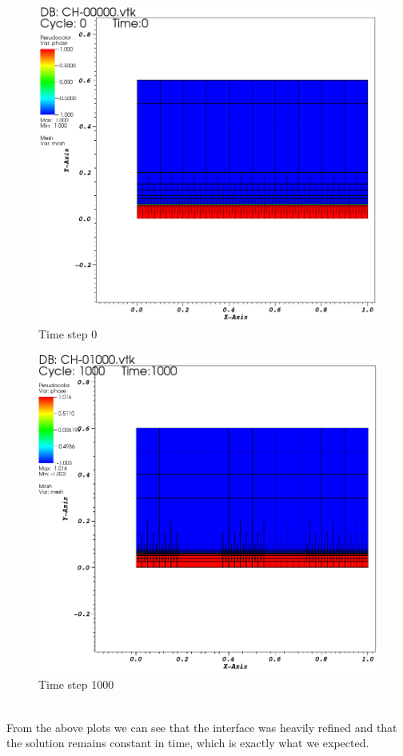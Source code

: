 \documentclass[11pt,fullpage]{article}
\theoremstyle{lemma}
\theoremstyle{definition}
\theoremstyle{lemma}
\begin{document}
\begin{figure}[!ht]
	\begin{minipage}{.4\paperwidth}
			\centering
			\includegraphics[scale=.9]{CHFlat1.png}
			\\Time step 0
	\end{minipage}%
	\begin{minipage}{.4\paperwidth}
			\centering
			\includegraphics[scale=.9]{CHFlat2.png}
			\\Time step 1000
	\end{minipage}
\end{figure}\\
From the above plots we can see that the interface was heavily refined and that the solution remains constant in time, which is exactly what we expected.
\end{document}
